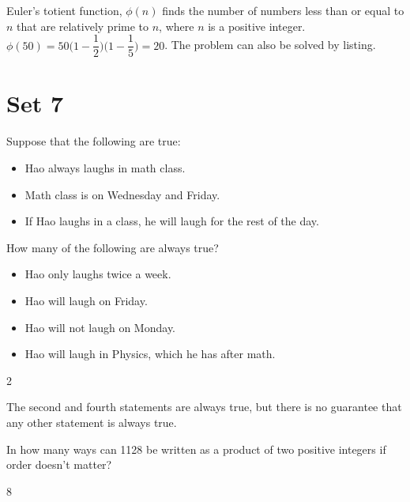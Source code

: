 \documentclass[11pt]{article}
\begin{document}
\begin{solution}
Euler's totient function, $\phi(n)$ finds the number of numbers less than or equal to $n$ that are relatively prime to $n$, where $n$ is a positive integer. $\phi(50) = 50\bigg(1-\dfrac{1}{2}\bigg)\bigg(1-\dfrac{1}{5}\bigg) = 20$.
The problem can also be solved by listing.
\end{solution}

\newpage

\section*{Set 7}

\begin{problem}%
Suppose that the following are true:
\begin{itemize}
	\item Hao always laughs in math class.
	\item Math class is on Wednesday and Friday.
	\item If Hao laughs in a class, he will laugh for the rest of the day.
\end{itemize}
How many of the following are always true?
\begin{itemize}
	\item Hao only laughs twice a week.
	\item Hao will laugh on Friday.
	\item Hao will not laugh on Monday.
	\item Hao will laugh in Physics, which he has after math.
\end{itemize}
\end{problem}

\begin{answer}
2
\end{answer}

\begin{solution}
The second and fourth statements are always true, but there is no guarantee that any other statement is always true.
\end{solution}


\begin{problem} %
In how many ways can 1128 be written as a product of two positive integers if order doesn't matter?
\end{problem}

\begin{answer}
8
\end{answer}
\end{document}
